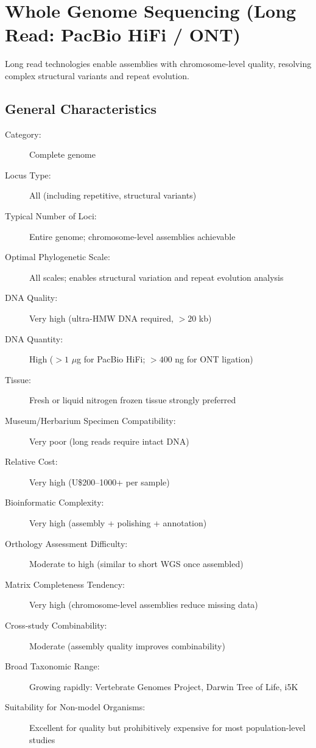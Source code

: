 \textcite{delsuc2005, jarvis2014, lewin2018, lozano-fernandez2022}

\section{Whole Genome Sequencing (Long Read: PacBio HiFi / ONT)}

Long read technologies enable assemblies with chromosome-level quality, resolving complex structural variants and repeat evolution.

\subsection{General Characteristics}

\begin{description}
\item[Category:] Complete genome
\item[Locus Type:] All (including repetitive, structural variants)
\item[Typical Number of Loci:] Entire genome; chromosome-level assemblies achievable
\item[Optimal Phylogenetic Scale:] All scales; enables structural variation and repeat evolution analysis
\item[DNA Quality:] Very high (ultra-HMW DNA required, \(>20\) kb)
\item[DNA Quantity:] High (\(>1\) $\mu$g for PacBio HiFi; \(>400\) ng for ONT ligation)
\item[Tissue:] Fresh or liquid nitrogen frozen tissue strongly preferred
\item[Museum/Herbarium Specimen Compatibility:] Very poor (long reads require intact DNA)
\item[Relative Cost:] Very high (U\$200--1000+ per sample)
\item[Bioinformatic Complexity:] Very high (assembly + polishing + annotation)
\item[Orthology Assessment Difficulty:] Moderate to high (similar to short WGS once assembled)
\item[Matrix Completeness Tendency:] Very high (chromosome-level assemblies reduce missing data)
\item[Cross-study Combinability:] Moderate (assembly quality improves combinability)
\item[Broad Taxonomic Range:] Growing rapidly: Vertebrate Genomes Project, Darwin Tree of Life, i5K
\item[Suitability for Non-model Organisms:] Excellent for quality but prohibitively expensive for most population-level studies
\end{description}

